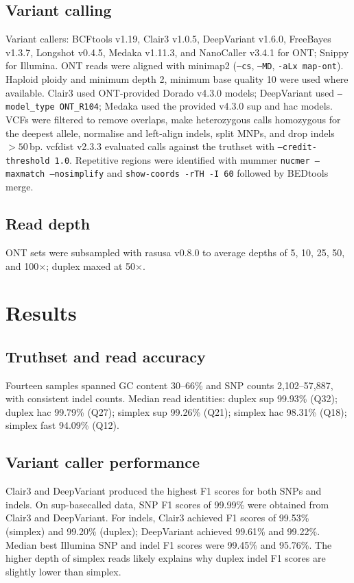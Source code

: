 \documentclass[11pt]{article}
\begin{document}
\subsection{Variant calling}
Variant callers: BCFtools v1.19, Clair3 v1.0.5, DeepVariant v1.6.0, FreeBayes v1.3.7, Longshot v0.4.5, Medaka v1.11.3, and NanoCaller v3.4.1 for ONT; Snippy for Illumina. ONT reads were aligned with minimap2 (\texttt{--cs}, \texttt{--MD}, \texttt{-aLx map-ont}). Haploid ploidy and minimum depth 2, minimum base quality 10 were used where available. Clair3 used ONT-provided Dorado v4.3.0 models; DeepVariant used \texttt{--model\_type ONT\_R104}; Medaka used the provided v4.3.0 sup and hac models. VCFs were filtered to remove overlaps, make heterozygous calls homozygous for the deepest allele, normalise and left-align indels, split MNPs, and drop indels $>50$\,bp. vcfdist v2.3.3 evaluated calls against the truthset with \texttt{--credit-threshold 1.0}. Repetitive regions were identified with mummer \texttt{nucmer --maxmatch --nosimplify} and \texttt{show-coords -rTH -I 60} followed by BEDtools merge.

\subsection{Read depth}
ONT sets were subsampled with rasusa v0.8.0 to average depths of 5, 10, 25, 50, and 100$\times$; duplex maxed at 50$\times$.

\section{Results}
\subsection{Truthset and read accuracy}
Fourteen samples spanned GC content 30--66\% and SNP counts 2{,}102--57{,}887, with consistent indel counts. Median read identities: duplex sup 99.93\% (Q32); duplex hac 99.79\% (Q27); simplex sup 99.26\% (Q21); simplex hac 98.31\% (Q18); simplex fast 94.09\% (Q12).

\subsection{Variant caller performance}
Clair3 and DeepVariant produced the highest F1 scores for both SNPs and indels. On sup-basecalled data, SNP F1 scores of 99.99\% were obtained from Clair3 and DeepVariant. For indels, Clair3 achieved F1 scores of 99.53\% (simplex) and 99.20\% (duplex); DeepVariant achieved 99.61\% and 99.22\%. Median best Illumina SNP and indel F1 scores were 99.45\% and 95.76\%. The higher depth of simplex reads likely explains why duplex indel F1 scores are slightly lower than simplex.
\end{document}
